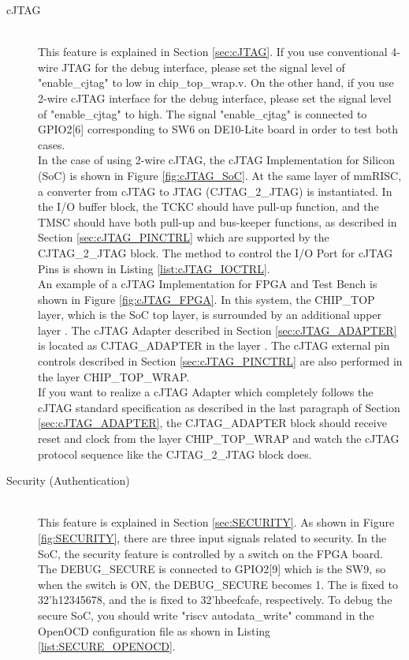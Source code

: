 \begin{description}
    \item[cJTAG]\mbox{}\\
    This feature is explained in Section \ref{sec:cJTAG}. If you use conventional 4-wire JTAG for the debug interface, please set the signal level of "enable\_cjtag" to low in chip\_top\_wrap.v. On the other hand, if you use 2-wire cJTAG interface for the debug interface, please set the signal level of "enable\_cjtag" to high. The signal  "enable\_cjtag" is connected to GPIO2[6] corresponding to SW6 on DE10-Lite board in order to test both cases.\\
    In the case of using 2-wire cJTAG,  the cJTAG Implementation for Silicon (SoC) is shown in Figure \ref{fig:cJTAG_SoC}. At the same layer of mmRISC, a converter from cJTAG to JTAG (CJTAG\_2\_JTAG) is instantiated. In the I/O buffer block, the TCKC should have pull-up function, and the TMSC should have both pull-up and bus-keeper functions, as described in Section \ref{sec:cJTAG_PINCTRL} which are supported by the CJTAG\_2\_JTAG block. The method to control the I/O Port for cJTAG Pins is shown in Listing \ref{list:cJTAG_IOCTRL}.\\
    An example of a cJTAG Implementation for FPGA and Test Bench is shown in Figure \ref{fig:cJTAG_FPGA}. In this system, the CHIP\_TOP layer, which is the SoC top layer, is surrounded by an additional upper layer . The cJTAG Adapter described in Section \ref{sec:cJTAG_ADAPTER} is located as CJTAG\_ADAPTER in the layer . The cJTAG external pin controls described in Section \ref{sec:cJTAG_PINCTRL} are also performed in the layer CHIP\_TOP\_WRAP.\\
    If you want to realize a cJTAG Adapter which completely follows the cJTAG standard specification as described in the last paragraph of Section \ref{sec:cJTAG_ADAPTER}, the CJTAG\_ADAPTER block should receive reset and clock from the layer CHIP\_TOP\_WRAP and watch the cJTAG protocol sequence like the CJTAG\_2\_JTAG block does.
    
    \item[Security (Authentication)]\mbox{}\\
    This feature is explained in Section \ref{sec:SECURITY}. As shown in Figure \ref{fig:SECURITY}, there are three input signals related to security. In the SoC, the security feature is controlled by a switch on the FPGA board. The DEBUG\_SECURE is connected to GPIO2[9] which is the SW9, so when the switch is ON, the DEBUG\_SECURE becomes 1. The  is fixed to 32'h12345678, and the  is fixed to 32'hbeefcafe, respectively. To debug the secure SoC, you should write "riscv autodata\_write" command in the OpenOCD configuration file as shown in Listing \ref{list:SECURE_OPENOCD}.


\end{description}
